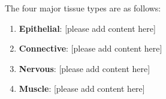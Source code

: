 \documentclass[10pt,twoside,twocolumn]{article}
\begin{document}
The four major tissue types are as follows:
	\begin{enumerate}
	\item \textbf{Epithelial}: [please add content here]
    \item \textbf{Connective}: [please add content here]
    \item \textbf{Nervous}: [please add content here]
    \item \textbf{Muscle}: [please add content here]
    \end{enumerate}



\end{document}
